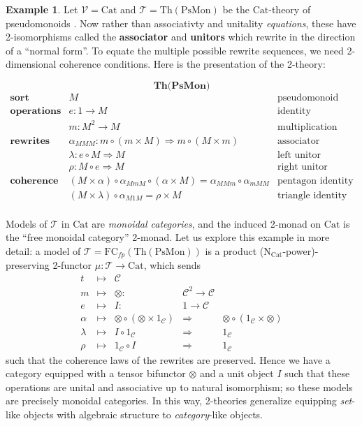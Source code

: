 \documentclass{amsart}
\theoremstyle{definition}
\newtheorem*{example*}{Example}
\newcommand{\Th}{\mathrm{Th}}
\newcommand{\Cat}{\mathrm{Cat}}
\newcommand{\FC}{\mathrm{FC}}
\newcommand{\NN}{\mathrm{N}}
\newcommand{\V}{\mathscr{V}}
\newcommand{\C}{\mathscr{C}}
\newcommand{\T}{\mathscr{T}}
\newcommand{\maps}{\colon}
\begin{document}
\begin{example*}
	Let $\V = \Cat$ and $\T = \Th(\mathrm{PsMon})$ be the $\Cat$-theory of pseudomonoids \cite{pseudo}. Now rather than associativty and unitality \textit{equations}, these have 2-isomorphisms called the \textbf{associator} and \textbf{unitors} which rewrite in the direction of a ``normal form''. To equate the multiple possible rewrite sequences, we need 2-dimensional coherence conditions. Here is the presentation of the 2-theory:
	
	$$\textbf{Th(PsMon)}$$
	\[\begin{array}{rll}
	\textbf{sort} & M & \text{pseudomonoid}\\
	\textbf{operations} & e\maps1 \to M & \text{identity}\\
	& m\maps M^2 \to M & \text{multiplication}\\
	\textbf{rewrites} & \alpha_{MMM}: m \circ (m \times M) \Rightarrow m \circ (M \times m) & \text{associator}\\
	& \lambda\maps e \circ M \Rightarrow M & \text{left unitor}\\
	& \rho\maps M\circ e \Rightarrow M & \text{right unitor}\\
	\textbf{coherence} & (M\times\alpha)\circ \alpha_{MmM}\circ (\alpha\times M) = \alpha_{MMm}\circ \alpha_{mMM} & \text{pentagon identity}\\
	& (M\times \lambda) \circ \alpha_{M1M} = \rho\times M & \text{triangle identity}\\
	\end{array}\]
\end{example*}

Models of $\T$ in $\Cat$ are \textit{monoidal categories}, and the induced 2-monad on $\Cat$ is the ``free monoidal category'' 2-monad. Let us explore this example in more detail: a model of $\T = \FC_{fp}(\Th(\mathrm{PsMon}))$ is a product ($\NN_\Cat$-power)-preserving 2-functor $\mu: \T\to \Cat$, which sends 
\[\begin{array}{rclcl}
	t & \mapsto & \C &&\\
	m & \mapsto & \otimes\maps & \C^2 \to \C &\\
	e & \mapsto & I\maps & 1\to \C &\\
	\alpha & \mapsto & \otimes \circ (\otimes \times 1_\C) & \Rightarrow & \otimes \circ (1_\C \times \otimes)\\
	\lambda & \mapsto & I\circ 1_\C & \Rightarrow & 1_\C\\
	\rho & \mapsto & 1_\C \circ I & \Rightarrow & 1_\C
\end{array}\]
such that the coherence laws of the rewrites are preserved. Hence we have a category equipped with a tensor bifunctor $\otimes$ and a unit object $I$ such that these operations are unital and associative up to natural isomorphism; so these models are precisely monoidal categories. In this way, 2-theories generalize equipping \textit{set}-like objects with algebraic structure to \textit{category}-like objects.
\end{document}
